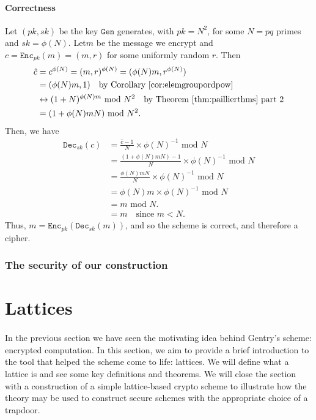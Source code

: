 \documentclass{article}
\theoremstyle{definition}
\newcommand{\Enc}{\texttt{Enc}}
\newcommand{\Dec}{\texttt{Dec}}
\newcommand{\Gen}{\texttt{Gen}}
\renewcommand{\mod}{\,\,\text{mod}\,\,}
\begin{document}
\paragraph{Correctness}
Let $(pk, sk)$ be the key $\Gen$ generates, with $pk = N^2$, for some $N = pq$
primes and $sk = \phi(N)$. Let$m$ be the message we encrypt and $c =
\Enc_{pk}(m) =(m, r)$ for some uniformly random $r$. Then
\begin{align*}
  \hat{c} &= c^{\phi(N)} = (m, r)^{\phi(N)} = (\phi(N)m, r^{\phi(N)}) \\
          &= (\phi(N)m, 1) \quad \text{by Corollary \ref{cor:elemgroupordpow}}\\
          &\leftrightarrow (1 + N)^{\phi(N)m} \mod N^2 \quad \text{by Theorem \ref{thm:paillierthms} part 2}\\
          &= (1 + \phi(N)mN) \mod N^2.
\end{align*}
Then, we have
\begin{align*}
  \Dec_{sk}(c) &= \frac{\hat{c} - 1}{N} \times \phi(N)^{-1} \mod N\\
               &= \frac{(1 + \phi(N)mN) - 1}{N} \times \phi(N)^{-1} \mod N\\
               &= \frac{\phi(N)mN}{N}\times \phi(N)^{-1} \mod N\\
               &= \phi(N)m \times \phi(N)^{-1} \mod N \\
               &= m \mod N. \\
               &= m \quad \text{since } m < N.
\end{align*}
Thus, $m = \Enc_{pk}(\Dec_{sk}(m))$, and so the scheme is correct, and therefore
a cipher.
\subsubsection{The security of our construction}
\paragraph{}
\section{Lattices}
\paragraph{}
In the previous section we have seen the motivating idea behind Gentry's scheme:
encrypted computation. In this section, we aim to provide a brief introduction
to the tool that helped the scheme come to life: lattices. We will define what a
lattice is and see some key definitions and theorems. We will close the section
with a construction of a simple lattice-based crypto scheme to illustrate how
the theory may be used to construct secure schemes with the appropriate choice
of a trapdoor. \cite{hoffstein2014introduction}
\end{document}
